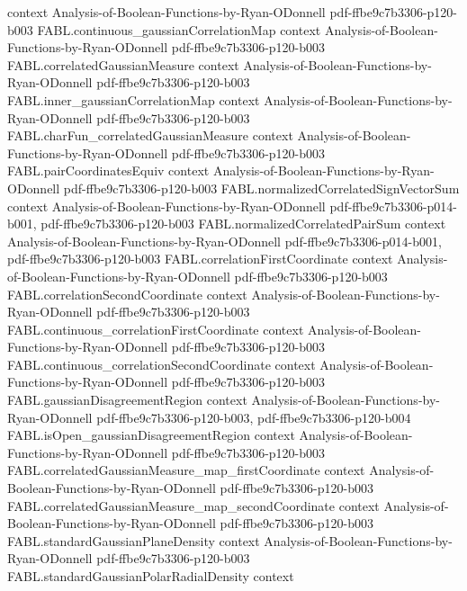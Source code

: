\begin{theorem}
  {context}
  {Analysis-of-Boolean-Functions-by-Ryan-ODonnell}
  {pdf-ffbe9c7b3306-p120-b003}
\proofstep
  {FABL.continuous_gaussianCorrelationMap}
  {context}
  {Analysis-of-Boolean-Functions-by-Ryan-ODonnell}
  {pdf-ffbe9c7b3306-p120-b003}
\proofstep
  {FABL.correlatedGaussianMeasure}
  {context}
  {Analysis-of-Boolean-Functions-by-Ryan-ODonnell}
  {pdf-ffbe9c7b3306-p120-b003}
\proofstep
  {FABL.inner_gaussianCorrelationMap}
  {context}
  {Analysis-of-Boolean-Functions-by-Ryan-ODonnell}
  {pdf-ffbe9c7b3306-p120-b003}
\proofstep
  {FABL.charFun_correlatedGaussianMeasure}
  {context}
  {Analysis-of-Boolean-Functions-by-Ryan-ODonnell}
  {pdf-ffbe9c7b3306-p120-b003}
\proofstep
  {FABL.pairCoordinatesEquiv}
  {context}
  {Analysis-of-Boolean-Functions-by-Ryan-ODonnell}
  {pdf-ffbe9c7b3306-p120-b003}
\proofstep
  {FABL.normalizedCorrelatedSignVectorSum}
  {context}
  {Analysis-of-Boolean-Functions-by-Ryan-ODonnell}
  {pdf-ffbe9c7b3306-p014-b001,
    pdf-ffbe9c7b3306-p120-b003}
\proofstep
  {FABL.normalizedCorrelatedPairSum}
  {context}
  {Analysis-of-Boolean-Functions-by-Ryan-ODonnell}
  {pdf-ffbe9c7b3306-p014-b001,
    pdf-ffbe9c7b3306-p120-b003}
\proofstep
  {FABL.correlationFirstCoordinate}
  {context}
  {Analysis-of-Boolean-Functions-by-Ryan-ODonnell}
  {pdf-ffbe9c7b3306-p120-b003}
\proofstep
  {FABL.correlationSecondCoordinate}
  {context}
  {Analysis-of-Boolean-Functions-by-Ryan-ODonnell}
  {pdf-ffbe9c7b3306-p120-b003}
\proofstep
  {FABL.continuous_correlationFirstCoordinate}
  {context}
  {Analysis-of-Boolean-Functions-by-Ryan-ODonnell}
  {pdf-ffbe9c7b3306-p120-b003}
\proofstep
  {FABL.continuous_correlationSecondCoordinate}
  {context}
  {Analysis-of-Boolean-Functions-by-Ryan-ODonnell}
  {pdf-ffbe9c7b3306-p120-b003}
\proofstep
  {FABL.gaussianDisagreementRegion}
  {context}
  {Analysis-of-Boolean-Functions-by-Ryan-ODonnell}
  {pdf-ffbe9c7b3306-p120-b003,
    pdf-ffbe9c7b3306-p120-b004}
\proofstep
  {FABL.isOpen_gaussianDisagreementRegion}
  {context}
  {Analysis-of-Boolean-Functions-by-Ryan-ODonnell}
  {pdf-ffbe9c7b3306-p120-b003}
\proofstep
  {FABL.correlatedGaussianMeasure_map_firstCoordinate}
  {context}
  {Analysis-of-Boolean-Functions-by-Ryan-ODonnell}
  {pdf-ffbe9c7b3306-p120-b003}
\proofstep
  {FABL.correlatedGaussianMeasure_map_secondCoordinate}
  {context}
  {Analysis-of-Boolean-Functions-by-Ryan-ODonnell}
  {pdf-ffbe9c7b3306-p120-b003}
\proofstep
  {FABL.standardGaussianPlaneDensity}
  {context}
  {Analysis-of-Boolean-Functions-by-Ryan-ODonnell}
  {pdf-ffbe9c7b3306-p120-b003}
\proofstep
  {FABL.standardGaussianPolarRadialDensity}
  {context}

\end{theorem}

